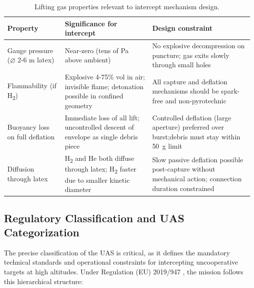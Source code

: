\begin{table}[H]
\centering
\caption{Lifting gas properties relevant to intercept mechanism design.}
\label{tab:gas_intercept}
\small
\begin{tabular}{@{}p{3.5cm}p{5.5cm}p{5.9cm}@{}}
\toprule
\textbf{Property} & \textbf{Significance for intercept} & \textbf{Design constraint} \\
\midrule
Gauge pressure ($\varnothing$ 2-6 m latex) & Near-zero (tens of Pa above ambient) \cite{Yajima2009ScientificApplications} & No explosive decompression on puncture; gas exits slowly through small holes \\[4pt]
 
Flammability (if H\textsubscript{2}) & Explosive 4-75\% vol in air; invisible flame; detonation possible in confined geometry \cite{NOAANationalWeatherService2024RadiosondeSheet, WorldMeteorologicalOrganization2018GuideGuide} & All capture and deflation mechanisms should be spark-free and non-pyrotechnic \\[4pt]
 
Buoyancy loss on full deflation & Immediate loss of all lift; uncontrolled descent of envelope as single debris piece & Controlled deflation (large aperture) preferred over burst;debris must stay within 50~g limit \\[4pt]
 
Diffusion through latex & H\textsubscript{2} and He both diffuse through latex; H\textsubscript{2} faster due to smaller kinetic diameter \cite{NOAANationalWeatherService2024RadiosondeSheet, WorldMeteorologicalOrganization2018GuideGuide} & Slow passive deflation possible post-capture without mechanical action; connection duration constrained \\
\bottomrule
\end{tabular}
\end{table}

\vspace{-20pt}
\subsection{Regulatory Classification and UAS Categorization}
\label{subsec:regulatory}

The precise classification of the UAS is critical, as it defines the mandatory technical standards and operational constraints for intercepting uncooperative targets at high altitudes. Under Regulation (EU) 2019/947 \cite{EuropeanCommission2019CommissionAircraft}, the mission follows this hierarchical structure:
\vspace{-10pt}

